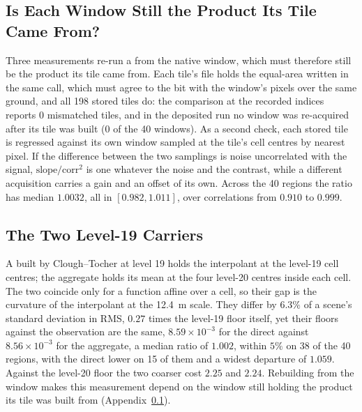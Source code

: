 

\subsection{Is Each Window Still the Product Its Tile Came From?}
\label{app:window_radiometry}
Three measurements re-run a  from the native window, which
must therefore still be the product its tile came from. Each tile's file
holds the equal-area  written in the same call, which
must agree to the bit with the window's pixels over the same ground, and
all 198 stored tiles do: the
comparison at the recorded indices reports 0 mismatched tiles, and in
the deposited run no window was re-acquired after its tile was built
(0 of the 40 windows). As a second check, each
stored tile is regressed against its own window sampled at the tile's
cell centres by nearest pixel. If the difference between the two
samplings is noise uncorrelated with the signal,
$\mathrm{slope}/\mathrm{corr}^2$ is one whatever the noise and the
contrast, while a different acquisition carries a gain and an offset of
its own. Across the 40 regions the ratio has median
$1.0032$, all in $[0.982, 1.011]$, over correlations from $0.910$ to
$0.999$.

\subsection{The Two Level-19 Carriers}
\label{app:level19_direct}
A  built by Clough--Tocher at level 19 holds the
interpolant at the level-19 cell centres; the aggregate holds its mean at
the four level-20 centres inside each cell. The two coincide only for a
function affine over a cell, so their gap is the curvature of the
interpolant at the \SI{12.4}{m} scale. They differ by $6.3\%$ of a
scene's standard deviation in RMS, $0.27$ times the level-19 floor
itself, yet their floors against the observation are the same,
$8.59\times10^{-3}$ for the direct  against
$8.56\times10^{-3}$ for the aggregate, a median ratio of $1.002$, within
$5\%$ on 38 of the 40 regions, with the direct  lower on 15
of them and a widest departure of $1.059$. Against the level-20 floor the
two coarser  cost $2.25$ and $2.24$. Rebuilding from the
window makes this measurement depend on the window still holding the
product its tile was built from (Appendix~\ref{app:window_radiometry}).

